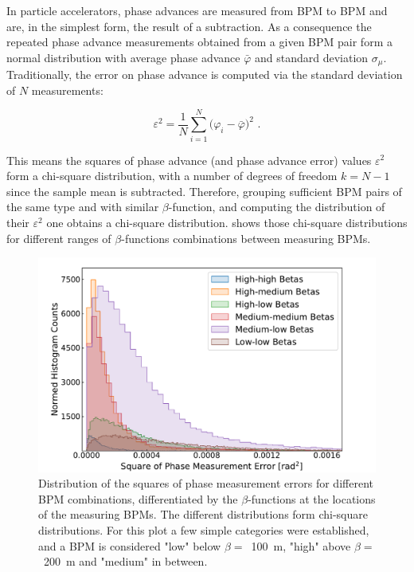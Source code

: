 In particle accelerators, phase advances are measured from BPM to BPM and are, in the simplest form, the result of a subtraction.
As a consequence the repeated phase advance measurements obtained from a given BPM pair form a normal distribution with average phase advance \(\bar{\varphi}\) and standard deviation \(\sigma_{\mu}\).
Traditionally, the error on phase advance is computed via the standard deviation of \(N\) measurements:

\begin{equation}
    \varepsilon^2 = \frac{1}{N} \sum_{i=1}^{N}\big(\varphi_{i} - \bar{\varphi} \big)^2 \text{ .}
    \label{equation:phase_error_calculation}
\end{equation}

This means the squares of phase advance (and phase advance error) values \(\varepsilon^2\) form a chi-square distribution, with a number of degrees of freedom  \(k = N - 1\) since the sample mean is subtracted.
Therefore, grouping sufficient BPM pairs of the same type and with similar \(\beta\)-function, and computing the distribution of their \(\varepsilon^2\) one obtains a chi-square distribution.
 shows those chi-square distributions for different ranges of \(\beta\)-functions combinations between measuring BPMs.

\begin{figure}[!htb]
    \centering
    \includegraphics*[width=\textwidth]{Figures/Other_Studies/phase_errors_squared_distributions.pdf}
    \caption{Distribution of the squares of phase measurement errors for different BPM combinations, differentiated by the \(\beta\)-functions at the locations of the measuring BPMs. The different distributions form chi-square distributions. For this plot a few simple categories were established, and a BPM is considered "low" below \(\beta =\)~\qty{100}{\meter}, "high" above \(\beta =\)~\qty{200}{\meter} and "medium" in between.}
    \label{figure:square_errors_histograms}
\end{figure}

